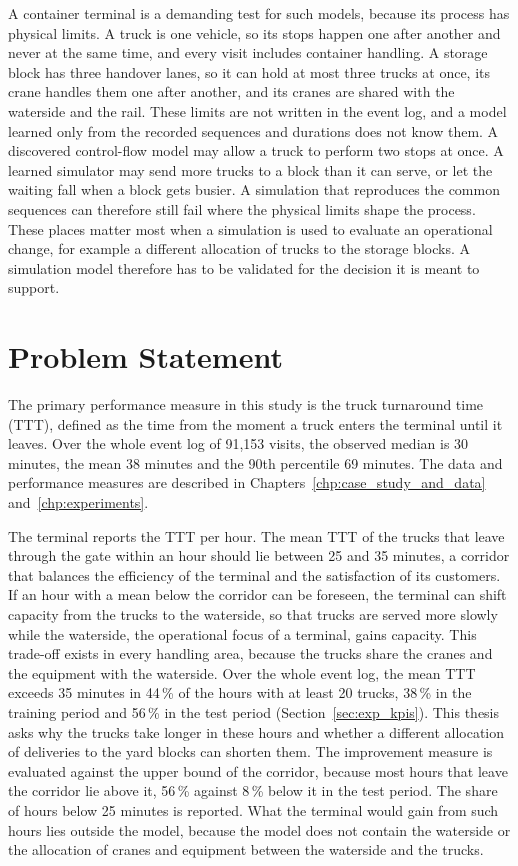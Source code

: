 A container terminal is a demanding test for such models, because its process has
physical limits. A truck is one vehicle, so its stops happen one after another and
never at the same time, and every visit includes container handling. A storage block has
three handover lanes, so it can hold at most three trucks at once, its crane
handles them one after another, and its cranes are shared with the waterside and
the rail. These limits are not written in the
event log, and a model learned only from the recorded sequences and durations does
not know them. A discovered control-flow model may allow a truck to perform two
stops at once. A learned simulator may send more trucks to a block than it can
serve, or let the waiting fall when a block gets busier. A simulation that reproduces the common sequences can therefore still fail where the physical limits shape the process. These places matter most when a simulation is used to evaluate an operational change, for example a different allocation of trucks to the storage blocks. A simulation model therefore has to be validated for the decision it is meant to support.

\section{Problem Statement}
\label{sec:prob_statement}

The primary performance measure in this study is the truck turnaround time (TTT),
defined as the time from the moment a truck enters the terminal until it leaves. Over the whole event log of 91,153 visits, the observed median is 30
minutes, the mean 38 minutes and the 90th percentile 69 minutes. The data and
performance measures are described in Chapters~\ref{chp:case_study_and_data}
and~\ref{chp:experiments}.

The terminal reports the TTT per hour. The mean TTT of the trucks that leave
through the gate within an hour should lie between 25 and 35 minutes, a corridor
that balances the efficiency of the terminal and the satisfaction of its customers.
If an hour with a mean below the corridor can be foreseen, the terminal can shift
capacity from the trucks to the waterside, so that trucks are served more slowly while
the waterside, the operational focus of a terminal, gains capacity. This trade-off
exists in every handling area, because the trucks share the cranes and the equipment
with the waterside. Over the whole event log, the mean TTT exceeds 35 minutes in 44\,\% of
the hours with at least 20 trucks, 38\,\% in the training period and 56\,\% in the
test period (Section~\ref{sec:exp_kpis}). This thesis asks why the trucks take
longer in these hours and whether a different allocation of deliveries to the yard
blocks can shorten them. The improvement measure is evaluated against the upper bound of the corridor, because
most hours that leave the corridor lie above it, 56\,\% against 8\,\% below it in
the test period. The share of hours below 25 minutes is reported. What the terminal
would gain from such hours lies outside the model, because the model does not contain
the waterside or the allocation of cranes and equipment between the waterside and the
trucks.


